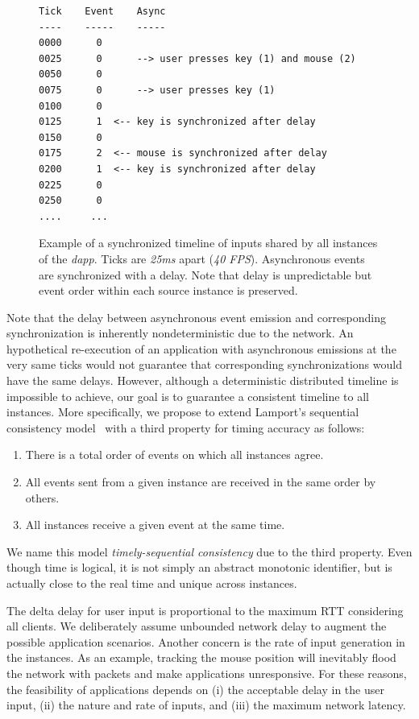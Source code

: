 \documentclass[sigplan,screen]{acmart}
\newcommand{\dapp}{\emph{dapp}\xspace}
\begin{document}
\begin{figure}[t]
{\scriptsize
\begin{verbatim}
Tick    Event    Async
----    -----    -----
0000      0
0025      0      --> user presses key (1) and mouse (2)
0050      0
0075      0      --> user presses key (1)
0100      0
0125      1  <-- key is synchronized after delay
0150      0
0175      2  <-- mouse is synchronized after delay
0200      1  <-- key is synchronized after delay
0225      0
0250      0
....     ...
\end{verbatim}
}
  \caption{
    \label{fig.timeline}
    Example of a synchronized timeline of inputs shared by all instances of the
    \dapp.
    Ticks are \emph{25ms} apart (\emph{40 FPS}).
    Asynchronous events are synchronized with a delay.
    Note that delay is unpredictable but event order within each source
    instance is preserved.
  }
\end{figure}

Note that the delay between asynchronous event emission and corresponding
synchronization is inherently nondeterministic due to the network.
An hypothetical re-execution of an application with asynchronous emissions at
the very same ticks would not guarantee that corresponding synchronizations
would have the same delays.
%
However, although a deterministic distributed timeline is impossible to
achieve, our goal is to guarantee a consistent timeline to all instances.
%
More specifically, we propose to extend Lamport's sequential consistency
model~\cite{lamport} with a third property for timing accuracy as follows:
%
\begin{enumerate}
    \item There is a total order of events on which all instances agree.
    \item All events sent from a given instance are received in the same order by others.
    \item All instances receive a given event at the same time.
\end{enumerate}
%
We name this model \emph{timely-sequential consistency} due to the third
property.
Even though time is logical, it is not simply an abstract monotonic identifier,
but is actually close to the real time and unique across instances.

The delta delay for user input is proportional to the maximum RTT considering
all clients.
We deliberately assume unbounded network delay to augment the possible
application scenarios.
Another concern is the rate of input generation in the instances.
As an example, tracking the mouse position will inevitably flood the network
with packets and make applications unresponsive.
For these reasons, the feasibility of applications depends on
    (i) the acceptable delay in the user input,
    (ii) the nature and rate of inputs, and
    (iii) the maximum network latency.
\end{document}
